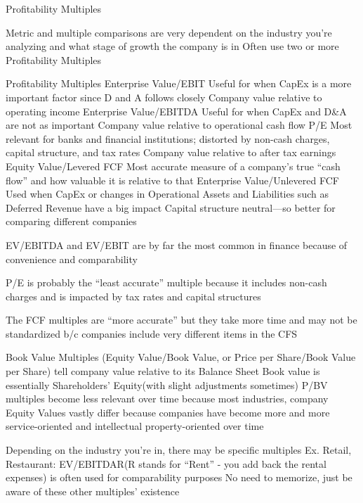 \documentclass[10pt]{article}
\begin{document}
    \begin{core}{Profitability Multiples}

      Metric and multiple comparisons are very dependent on the industry you’re analyzing and what stage of growth the company is in
      Often use two or more Profitability Multiples

      Profitability Multiples
        Enterprise Value/EBIT
          Useful for when CapEx is a more important factor since D and A follows closely
          Company value relative to operating income
        Enterprise Value/EBITDA
          Useful for when CapEx and D&A are not as important
          Company value relative to operational cash flow
        P/E
          Most relevant for banks and financial institutions; distorted by non-cash charges, capital structure, and tax rates
          Company value relative to after tax earnings
        Equity Value/Levered FCF
          Most accurate measure of a company’s true “cash flow” and how valuable it is relative to that
        Enterprise Value/Unlevered FCF
          Used when CapEx or changes in Operational Assets and Liabilities such as Deferred Revenue have a big impact
          Capital structure neutral—so better for comparing different companies

      EV/EBITDA and EV/EBIT are by far the most common in finance because of convenience and comparability

      P/E is probably the “least accurate” multiple because it includes non-cash charges and is impacted by tax rates and capital structures

      The FCF multiples are “more accurate” but they take more time and may not be standardized b/c companies include very different items in the CFS

      Book Value Multiples (Equity Value/Book Value, or Price per Share/Book Value per Share) tell company value relative to its Balance Sheet
        Book value is essentially Shareholders’ Equity(with slight adjustments sometimes)
        P/BV multiples become less relevant over time because most industries, company Equity Values vastly differ because companies have become more and more service-oriented and intellectual property-oriented over time

      Depending on the industry you’re in, there may be specific multiples
        Ex. Retail, Restaurant: EV/EBITDAR(R stands for “Rent” - you add back the rental expenses) is often used for comparability purposes
        No need to memorize, just be aware of these other multiples’ existence


\end{core}
\end{document}
